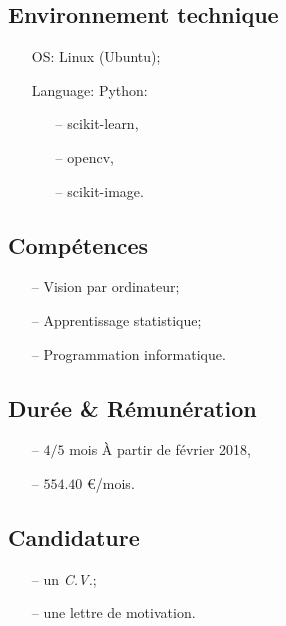 \documentclass[a4paper,11pt]{article}
\begin{document}
    \subsection*{Environnement technique}
    \begin{itemize}
        \item[OS:] Linux (Ubuntu);
        \item[Language:] Python:
        \begin{itemize}
            \item[--] scikit-learn,
            \item[--] opencv,
            \item[--] scikit-image.
        \end{itemize}
    \end{itemize}

    \subsection*{Compétences}
    \begin{itemize}
      \item[--] Vision par ordinateur;
      \item[--] Apprentissage statistique;
      \item[--] Programmation informatique.
    \end{itemize}

    \subsection*{Durée \& Rémunération}
    \begin{itemize}
        \item[--] $4/5$ mois \`A partir de février 2018,
        \item[--] $554.40$ \euro/mois.
    \end{itemize}

    \subsection*{Candidature}
    \begin{itemize}
        \item[--] un \textit{C.V.};
        \item[--] une lettre de motivation.
    \end{itemize}
\end{document}
